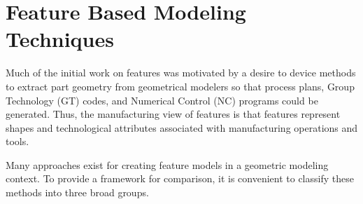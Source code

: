 	\section{Feature Based Modeling Techniques}

    Much of the initial work on features was motivated by a desire to
    device methods to extract part geometry from geometrical modelers so that
    process plans, Group Technology (GT) codes, and Numerical Control
    (NC) programs could be generated. Thus,
    the manufacturing view of features is that features represent shapes and
    technological attributes associated with manufacturing operations and tools.


    Many approaches exist for creating feature models in a geometric modeling 
	context. To provide a framework for comparison, it is convenient to 
	classify these methods into three broad groups.

